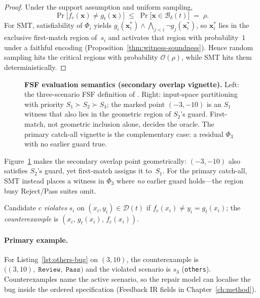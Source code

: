 \begin{proof}
Under the support assumption and uniform sampling,
\[
  \Pr\bigl[f_c(\mathbf{x})\neq g_t(\mathbf{x})\bigr]
  \;\le\;
  \Pr\bigl[\mathbf{x}\in\mathcal{B}_\delta(t)\bigr]
  \;=\;\rho.
\]
For SMT, satisfiability of $\Phi_i$ yields
$g_i(\mathbf{x}_i^*)\land\bigwedge_{j<i}\neg g_j(\mathbf{x}_i^*)$, so
$\mathbf{x}_i^*$ lies in the exclusive first-match region of~$s_i$ and
activates that region with probability~$1$ under a faithful encoding
(Proposition~\ref{thm:witness-soundness}).
Hence random sampling hits the critical regions with probability
$\mathcal{O}(\rho)$, while SMT hits them deterministically.
\end{proof}

\begin{figure}[t]
  \centering
  \caption{\textbf{FSF evaluation semantics (secondary overlap vignette).}
    Left: the three-scenario FSF definition of .
    Right: input-space partitioning with priority $S_1 \succ S_2 \succ S_3$;
    the marked point $(-3,-10)$ is an $S_1$ witness that also lies in the
    geometric region of $S_2$'s guard.
    First-match, not geometric inclusion alone, decides the oracle.
    The primary catch-all vignette is the complementary case: a residual
    $\Phi_3$ with no earlier guard true.}
  \label{fig:fsf-semantics}
\end{figure}

Figure~\ref{fig:fsf-semantics} makes the secondary overlap point
geometrically: $(-3,-10)$ also satisfies $S_2$'s guard, yet first-match
assigns it to~$S_1$.
For the primary catch-all, SMT instead places a witness in $\Phi_3$ where
\emph{no} earlier guard holds---the region busy Reject/Pass suites omit.

\begin{definition}
\label{def:violation}
Candidate $c$ \emph{violates} $s_i$ on $(x_i, y_i) \in \mathcal{D}(t)$ if
$f_c(x_i) \neq y_i = g_t(x_i)$; the \emph{counterexample} is
$(x_i,\,g_t(x_i),\,f_c(x_i))$.
\end{definition}

\paragraph{Primary example.}
For Listing~\ref{lst:others-bug} on $(3,10)$, the counterexample is
$\bigl((3,10),\;\texttt{Review},\;\texttt{Pass}\bigr)$ and the violated
scenario is $s_3$ (\texttt{others}).
Counterexamples name the active scenario, so the repair model can localise
the bug inside the ordered specification
(Feedback IR fields in Chapter~\ref{ch:method}).

